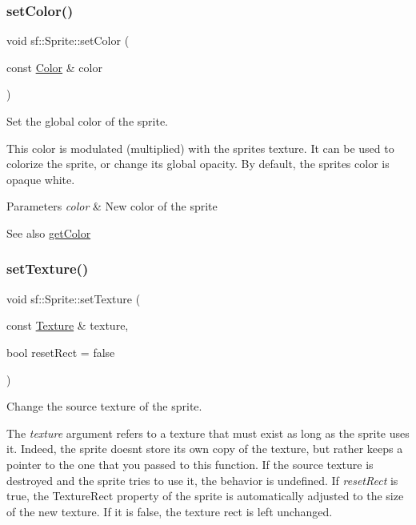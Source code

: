 \subsubsection{\texorpdfstring{setColor()}{setColor()}}
{\footnotesize\ttfamily void sf\+::\+Sprite\+::set\+Color (\begin{DoxyParamCaption}\item[{const \mbox{\hyperlink{classsf_1_1_color}{Color}} \&}]{color }\end{DoxyParamCaption})}



Set the global color of the sprite. 

This color is modulated (multiplied) with the sprite\textquotesingle{}s texture. It can be used to colorize the sprite, or change its global opacity. By default, the sprite\textquotesingle{}s color is opaque white.


\begin{DoxyParams}{Parameters}
{\em color} & New color of the sprite\\
\hline
\end{DoxyParams}
\begin{DoxySeeAlso}{See also}
\mbox{\hyperlink{classsf_1_1_sprite_ac5f419f37b4e38f7a94186e3a3e303e1}{get\+Color}} \begin{DoxyVerb}\end{DoxyVerb}
 
\end{DoxySeeAlso}
\mbox{\label{classsf_1_1_sprite_a3729c88d88ac38c19317c18e87242560}} 
\subsubsection{\texorpdfstring{setTexture()}{setTexture()}}
{\footnotesize\ttfamily void sf\+::\+Sprite\+::set\+Texture (\begin{DoxyParamCaption}\item[{const \mbox{\hyperlink{classsf_1_1_texture}{Texture}} \&}]{texture,  }\item[{bool}]{reset\+Rect = {\ttfamily false} }\end{DoxyParamCaption})}



Change the source texture of the sprite. 

The {\itshape texture} argument refers to a texture that must exist as long as the sprite uses it. Indeed, the sprite doesn\textquotesingle{}t store its own copy of the texture, but rather keeps a pointer to the one that you passed to this function. If the source texture is destroyed and the sprite tries to use it, the behavior is undefined. If {\itshape reset\+Rect} is true, the Texture\+Rect property of the sprite is automatically adjusted to the size of the new texture. If it is false, the texture rect is left unchanged.


